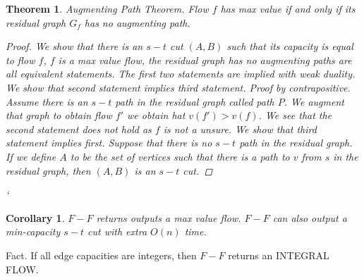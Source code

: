 \documentclass[a4paper]{article}
\theoremstyle{plain}
\newtheorem{thm}{Theorem}[section]
\newtheorem*{cor}{Corollary}
\theoremstyle{definition}
\theoremstyle{remark}
\begin{document}
		\begin{thm}
			Augmenting Path Theorem. Flow $f$ has max value if and only if its residual graph $G_f$ has no augmenting path.
			\begin{proof}
				We show that there is an $s-t$ cut $(A,B)$ such that its capacity is equal to flow $f$, $f$ is a max value flow, the residual graph has no augmenting paths are all equivalent statements. The first two statements are implied with weak duality. We show that second statement implies third statement. Proof by contrapositive. Assume there is an $s-t$ path in the residual graph called path $P$. We augment that graph to obtain flow  $f'$ we obtain hat $v(f') > v(f)$. We see that the second statement does not hold as $f$ is not a unsure. We show that third statement implies first. Suppose that there is no $s-t$ path in the residual graph. If we define $A$ to be the set of vertices such that there is a path to $v$ from $s$ in the residual graph, then $(A,B)$ is an $s-t$ cut. 
			\end{proof}`
		\end{thm}
		\begin{cor}
			$F-F$ returns outputs a max value flow. $F-F$ can also output a min-capacity $s-t$ cut with extra $O(n)$ time. 
		\end{cor}
		Fact. If all edge capacities are integers, then $F-F$ returns an INTEGRAL FLOW. 
\end{document}
